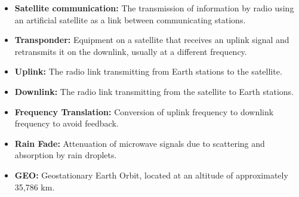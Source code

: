 \documentclass[12pt,a4paper]{article}
\begin{document}
\begin{tcolorbox}[defbox, title={\textbf{One-Line Definitions}}]
\begin{itemize}[leftmargin=*, itemsep=2.5pt, topsep=0pt]
  \item \textbf{Satellite communication:} The transmission of information by radio using an artificial satellite as a link between communicating stations.
  \item \textbf{Transponder:} Equipment on a satellite that receives an uplink signal and retransmits it on the downlink, usually at a different frequency.
  \item \textbf{Uplink:} The radio link transmitting from Earth stations to the satellite.
  \item \textbf{Downlink:} The radio link transmitting from the satellite to Earth stations.
  \item \textbf{Frequency Translation:} Conversion of uplink frequency to downlink frequency to avoid feedback.
  \item \textbf{Rain Fade:} Attenuation of microwave signals due to scattering and absorption by rain droplets.
  \item \textbf{GEO:} Geostationary Earth Orbit, located at an altitude of approximately 35,786 km.
\end{itemize}
\end{tcolorbox}
\end{document}
